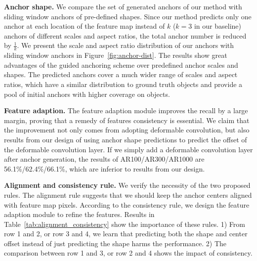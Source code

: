 \documentclass[10pt,twocolumn,letterpaper]{article}
\begin{document}
\noindent
\textbf{Anchor shape.}
We compare the set of generated anchors of our method with sliding window
anchors of pre-defined shapes.
Since our method predicts only one anchor at each location of the feature map
instead of $k$ ($k=3$ in our baseline) anchors of different scales and
aspect ratios, the total anchor number is reduced by $\frac{1}{k}$.
We present the scale and aspect ratio distribution of our anchors with
sliding window anchors in Figure~\ref{fig:anchor-dist}.
The results show great advantages of the guided anchoring scheme over
predefined anchor scales and shapes. The predicted anchors cover a much wider
range of scales and aspect ratios, which have a similar distribution to
ground truth objects and provide a pool of initial anchors with higher
coverage on objects.

\noindent
\textbf{Feature adaption.}
The feature adaption module improves the recall by a large margin,
proving that a remedy of features consistency is essential.
We claim that the improvement not only comes from adopting deformable
convolution, but also results from our design of using anchor shape predictions
to predict the offset of the deformable convolution layer.
If we simply add a deformable convolution layer after anchor generation,
the results of AR100/AR300/AR1000 are 56.1\%/62.4\%/66.1\%, which are inferior to
results from our design.

\noindent
\textbf{Alignment and consistency rule.}
We verify the necessity of the two proposed rules.
The alignment rule suggests that we should keep the anchor centers aligned with
feature map pixels.
According to the consistency rule, we design the feature adaption module to
refine the features.
Results in Table~\ref{tab:alignment_consistency} show the importance of these rules.
1) From row 1 and 2, or row 3 and 4, we learn that predicting both the shape
and center offset instead of just predicting the shape harms the performance.
2) The comparison between row 1 and 3, or row 2 and 4 shows the impact of consistency.
\end{document}
